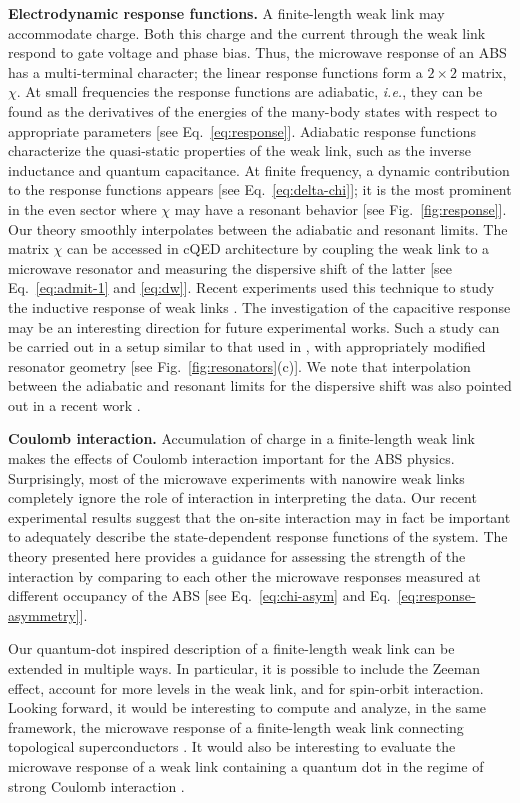 \documentclass[aps,reprint,longbibliography, prb]{revtex4-2}
\begin{document}
\textbf{Electrodynamic response functions.} A finite-length weak link may accommodate charge. Both this charge and the current through the weak link respond to gate voltage and phase bias. Thus, the microwave response of an ABS has a  multi-terminal character; the linear response functions form a $2\times 2$ matrix, $\chi$. At small frequencies the response functions are adiabatic, \textit{i.e.}, they can be found as the derivatives of the energies of the many-body states with respect to appropriate parameters [see Eq.~\eqref{eq:response}]. Adiabatic response functions characterize the quasi-static properties of the weak link, such as the inverse inductance and quantum capacitance. At finite frequency, a dynamic contribution to the response functions appears [see Eq.~\eqref{eq:delta-chi}]; it is the most prominent in the even sector where $\chi$ may have a resonant behavior [see Fig.~\ref{fig:response}]. Our theory smoothly interpolates between the adiabatic and resonant limits. The matrix $\chi$ can be accessed in cQED architecture by coupling the weak link to a microwave resonator and measuring the dispersive shift of the latter [see Eq.~\eqref{eq:admit-1} and \eqref{eq:dw}]. Recent experiments used this technique to study the inductive response of weak links \cite{metzger2021, fatemi2021}. The investigation of the capacitive response may be an interesting direction for future experimental works. Such a study can be carried out in a setup similar to that used in \cite{metzger2021, fatemi2021}, with appropriately modified resonator geometry [see Fig.~\ref{fig:resonators}(c)]. We note that interpolation between the adiabatic and resonant limits for the dispersive shift was also pointed out in a recent work \cite{park2020}.

\textbf{Coulomb interaction.} Accumulation of charge in a finite-length weak link makes the effects of Coulomb interaction important for the ABS physics. Surprisingly, most of the microwave experiments with nanowire weak links completely ignore the role of interaction in interpreting the data. Our recent experimental results \cite{fatemi2021} suggest that the on-site interaction may in fact be important to adequately describe the state-dependent response functions of the system. The theory presented here provides a guidance for assessing the strength of the interaction by comparing to each other the microwave responses measured at different occupancy of the ABS [see Eq.~\eqref{eq:chi-asym} and Eq.~\eqref{eq:response-asymmetry}].

Our quantum-dot inspired description of a finite-length weak link can be extended in multiple ways. In particular, it is possible to include the Zeeman effect, account for more levels in the weak link, and for spin-orbit interaction.
Looking forward, it would be interesting to compute and analyze, in the same framework, the microwave response of a finite-length weak link connecting topological superconductors \cite{fu2009, vayrynen2015}. It would also be interesting to evaluate the microwave response of a weak link containing a quantum dot in the regime of strong Coulomb interaction \cite{glazman2015, meng2009, novotny2015, novotny2019, yeyati2011, pillet2013, lee2012, chang2013}.
\end{document}
